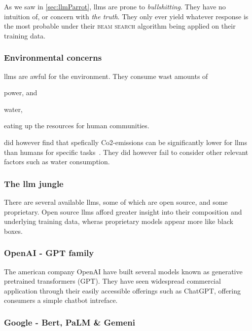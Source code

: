 As we saw in \cref{sec:llmParrot}, \acrshort{llms} are prone to
\textit{bullshitting}. They have no intuition of, or concern with \textit{the
    truth}. They only ever yield whatever response is the most probable under their
\textsc{beam search} algorithm being applied on their training data.

\subsubsection*{Environmental concerns}

\acrshort{llms} are awful for the environment. They consume wast amounts of \begin{inparaenum}
    \item power,
    and
    \item water,
\end{inparaenum}
eating up the resources for human communities.

\citeauthor{llmCarbon} did however find that spefically Co2-emissions can be
significantly lower for \acrshort{llms} than humans for specific
tasks~\cite{llmCarbon}. They did however fail to consider other relevant factors such
as water consumption.


\subsubsection{The \acrshort{llm} jungle}\label{sec:llmJungle}

There are several available \acrshort{llms}, some of which are open source, and some proprietary.
Open source \acrshort{llms} afford greater insight into their composition and underlying training
data, wheras proprietary models appear more like black boxes.

\subsubsection*{OpenAI - GPT family}

The american company OpenAI have built several models known as generative pretrained transformers
(GPT). They have seen widespread  commercial application through their easily accessible offerings
such as ChatGPT, offering consumers a simple chatbot intreface.

\subsubsection*{Google - Bert, PaLM \& Gemeni}

